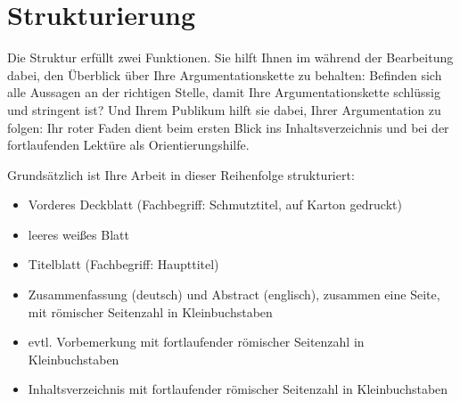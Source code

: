 \chapter{Strukturierung}
\label{chap:strukturierung}

Die Struktur erfüllt zwei Funktionen. Sie hilft Ihnen im während der Bearbeitung dabei, den Überblick über Ihre Argumentationskette zu behalten: Befinden sich alle Aussagen an der richtigen Stelle, damit Ihre Argumentationskette schlüssig und stringent ist? Und Ihrem Publikum hilft sie dabei, Ihrer Argumentation zu folgen: Ihr roter Faden dient beim ersten Blick ins Inhaltsverzeichnis und bei der fortlaufenden Lektüre als Orientierungshilfe.

Grundsätzlich ist Ihre Arbeit in dieser Reihenfolge strukturiert:
\begin{itemize}[label={--}]
\item Vorderes Deckblatt (Fachbegriff: Schmutztitel, auf Karton gedruckt)
\item leeres weißes Blatt
\item Titelblatt (Fachbegriff: Haupttitel)
\item Zusammenfassung (deutsch) und Abstract (englisch), zusammen eine Seite, mit römischer Seitenzahl in Kleinbuchstaben
\item evtl. Vorbemerkung mit fortlaufender römischer Seitenzahl in Kleinbuchstaben
\item Inhaltsverzeichnis mit fortlaufender römischer Seitenzahl in Kleinbuchstaben
\end{itemize}

